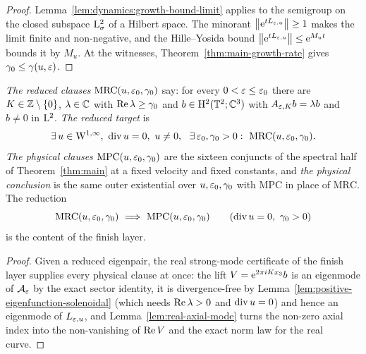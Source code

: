\begin{proof}
  \leanok
  Lemma~\ref{lem:dynamics:growth-bound-limit} applies to the semigroup on the closed subspace
  $\mathrm{L}^2_\sigma$ of a Hilbert space.  The minorant $\left\|\mathrm{e}^{tL_{\varepsilon,u}}\right\|\geq1$ makes the
  limit finite and non-negative, and the Hille--Yosida bound
  $\left\|\mathrm{e}^{tL_{\varepsilon,u}}\right\|\leq\mathrm{e}^{M_ut}$ bounds it by $M_u$.  At the witnesses,
  Theorem~\ref{thm:main-growth-rate} gives $\gamma_0\leq\gamma(u,\varepsilon)$.
\end{proof}


\begin{definition}
  \label{def:main:physical-clauses}
  \leanok
  \emph{The reduced clauses} $\mathrm{MRC}(u,\varepsilon_0,\gamma_0)$ say: for every
  $0<\varepsilon\leq\varepsilon_0$ there are $K\in\mathbb{Z}\setminus\{0\}$, $\lambda\in\mathbb{C}$ with
  $\operatorname{Re}\lambda\geq\gamma_0$ and $b\in\mathrm{H}^2(\mathbb{T}^2;\mathbb{C}^3)$ with
  $A_{\varepsilon,K}b=\lambda b$ and $b\neq0$ in $\mathrm{L}^2$.  \emph{The reduced target}
  is
  \[
    \exists\,u\in\W^{1,\infty},\ \Div u=0,\ u\neq0,\ \
    \exists\,\eps_0,\gamma_0>0:\ \mathrm{MRC}(u,\eps_0,\gamma_0).
  \]
  \emph{The physical clauses} $\mathrm{MPC}(u,\varepsilon_0,\gamma_0)$ are the
  sixteen conjuncts of the spectral half of Theorem~\ref{thm:main} at a fixed
  velocity and fixed constants, and \emph{the physical conclusion} is the same
  outer existential over $u,\varepsilon_0,\gamma_0$ with $\mathrm{MPC}$ in place of
  $\mathrm{MRC}$.  The reduction
  \[
    \mathrm{MRC}(u,\eps_0,\gamma_0)\ \Longrightarrow\ \mathrm{MPC}(u,\eps_0,\gamma_0)
    \qquad(\Div u=0,\ \gamma_0>0)
  \]
  is the content of the finish layer.
\end{definition}

\begin{proof}
  \leanok
  Given a reduced eigenpair, the real strong-mode certificate of the finish
  layer supplies every physical clause at once: the lift
  $V=\mathrm{e}^{2\pi iKx_3}b$ is an eigenmode of $\mathcal{A}_\varepsilon$ by the exact
  sector identity, it is divergence-free by
  Lemma~\ref{lem:positive-eigenfunction-solenoidal} (which needs
  $\operatorname{Re}\lambda>0$ and $\operatorname{div} u=0$) and hence an eigenmode of $L_{\varepsilon,u}$, and
  Lemma~\ref{lem:real-axial-mode} turns the non-zero axial index into the
  non-vanishing of $\operatorname{Re} V$ and the exact norm law for the real curve.
\end{proof}

